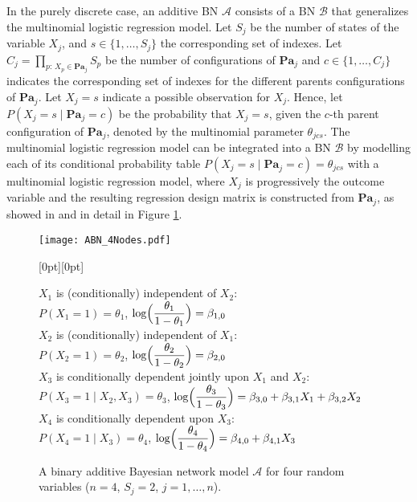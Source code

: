 \documentclass{svproc}
\newcommand{\Z}{{\textbf{\textit{Z}}}}
\newcommand{\Abn}{{\mathcal{A}}}
\newcommand{\Bay}{{\mathcal{B}}}
\newcommand{\Mod}{{\mathcal{M}}}
\newcommand{\Par}{{\mathbf{Pa}_j}}
\newcommand{\MP}[1]{\textcolor{red}{#1}}
\newcommand{\rf}[1]{\textcolor{green}{#1}}
\begin{document}
In the purely discrete case, an additive BN $\Abn$ consists of a BN $\Bay$ that generalizes the multinomial logistic regression model. %
Let $S_j$ be the number of states of the variable $X_j$, and $s \in \{1,\dots, S_j\}$ the corresponding set of indexes.
Let $C_j = \prod_{p:\,X_p \in \Par} S_p$ be the number of configurations of $\Par$ and $c \in \{1, \dots, C_j\}$ indicates
the corresponding set of indexes for the different parents configurations of $\Par$.
Let $X_j=s$ indicate a possible observation for $X_j$. Hence, let $P(X_j = s\mid  \Par = c)$
be the probability that $X_j = s$, given the $c$-th parent configuration of $\Par$, denoted by the multinomial parameter $\theta_{jcs}$.
The multinomial logistic regression model %
can be integrated into a BN $\Bay$ by modelling each of its conditional probability table
$P(X_j=s\mid  \Par = c)=\theta_{jcs}$ with a multinomial logistic regression model, where $X_j$ is progressively the outcome variable and the resulting regression design matrix is constructed from $\Par$, as showed in \cite{Rijmen2008} and in detail in Figure \ref{BN_Col}. 


\begin{figure}
\begin{flushright}
\texttt{[image: ABN\_4Nodes.pdf]}\hspace*{0.3cm}
\caption{A binary additive Bayesian network model $\Abn$ for four random variables ($n=4$, $S_j=2$, $j=1,\dots,n$).}
\label{BN_Col}
\end{flushright}
\hspace*{0.3cm}
\raisebox{3cm}[0pt][0pt]{
\parbox[c]{11.5cm}{%
$X_1$ is (conditionally) independent of $X_2$:\\ 
$P(X_1=1)=\theta_1$, $\log\Bigl(\displaystyle\frac{\theta_{1}}{1-\theta_{1}}\Bigr)=\beta_{1,0}$\\%
$X_2$ is (conditionally) independent of $X_1$:\\
$P(X_2=1)=\theta_2$, $\log\Bigl(\displaystyle\frac{\theta_{2}}{1-\theta_{2}}\Bigr)=\beta_{2,0}$\\%
$X_3$ is conditionally dependent jointly upon $X_1$ and $X_2$:\\
$P(X_3=1\mid X_2,X_3)=\theta_3$, $\log\Bigl(\displaystyle\frac{\theta_{3}}{1-\theta_{3}}\Bigr)=\beta_{3,0}+\beta_{3,1}X_1+\beta_{3,2}X_2$\\%
$X_4$ is conditionally dependent upon $X_3$:\\
$P(X_4=1\mid X_3)=\theta_4$, $\log\Bigl(\displaystyle\frac{\theta_{4}}{1-\theta_{4}}\Bigr)=\beta_{4,0}+\beta_{4,1}X_3$
\vspace{1.3cm}
}}
\end{figure}
\end{document}
